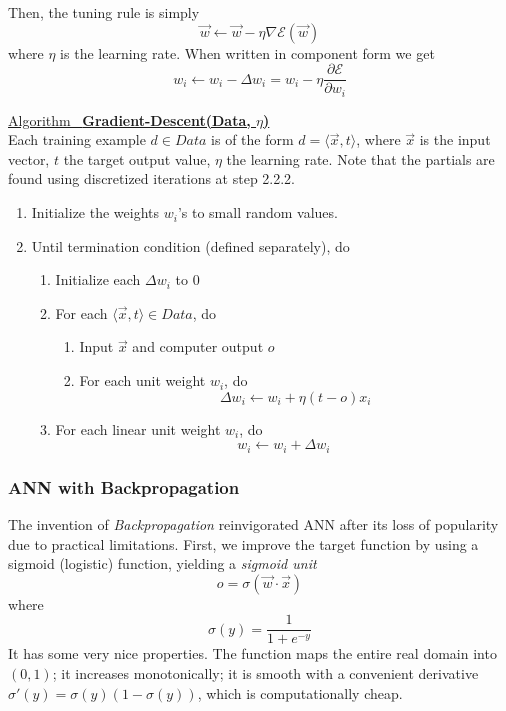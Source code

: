 \documentclass[12pt]{article}  %
\newcommand{\algtitle}[1]{\underline{Algorithm \ {\bf #1}} \vspace*{1mm}\\}
\begin{document}
Then, the tuning rule is simply $$\vec{w} \leftarrow \vec{w} - \eta \nabla \mathcal{E}(\vec{w})$$ where $\eta$ is the learning rate. When written in component form we get $$w_i \leftarrow w_i - \Delta w_i = w_i - \eta \frac{\partial \mathcal{E}}{\partial w_i}$$


\algtitle{Gradient-Descent(Data, $\eta$)}
Each training example $d \in Data$ is of the form $d = \langle \vec{x}, t \rangle$, where $\vec{x}$ is the input vector, $t$ the target output value, $\eta$ the learning rate. Note that the partials are found using discretized iterations at step 2.2.2.

\begin{enumerate}
	\item Initialize the weights $w_i$'s to small random values.
	\item Until termination condition (defined separately), do
		\begin{enumerate}
			\item Initialize each $\Delta w_i$ to 0
			\item For each $\langle \vec{x}, t \rangle \in Data$, do 
			\begin{enumerate}
				\item Input $\vec{x}$ and computer output $o$
				\item For each unit weight $w_i$, do $$\Delta w_i \leftarrow w_i + \eta(t-o)x_i$$
			\end{enumerate}
			\item For each linear unit weight $w_i$, do $$w_i \leftarrow w_i + \Delta w_i$$
		\end{enumerate}
\end{enumerate}





\subsubsection{ANN with Backpropagation}

The invention of {\em Backpropagation} reinvigorated ANN after its loss of popularity due to practical limitations. First, we improve the target function by using a sigmoid (logistic) function, yielding a {\em sigmoid unit} $$o = \sigma (\vec{w} \cdot \vec{x})$$ where $$\sigma(y) = \frac{1}{1+e^{-y}}$$ It has some very nice properties. The function maps the entire real domain into $(0,1)$; it increases monotonically; it is smooth with a convenient derivative $\sigma'(y) = \sigma(y) (1 - \sigma(y))$, which is computationally cheap.
\end{document}
